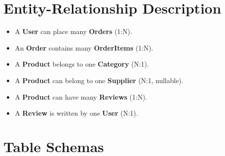 \documentclass[12pt,a4paper]{report}
\begin{document}
\section{Entity-Relationship Description}
\begin{itemize}[noitemsep]
  \item A \textbf{User} can place many \textbf{Orders} (1:N).
  \item An \textbf{Order} contains many \textbf{OrderItems} (1:N).
  \item A \textbf{Product} belongs to one \textbf{Category} (N:1).
  \item A \textbf{Product} can belong to one \textbf{Supplier} (N:1, nullable).
  \item A \textbf{Product} can have many \textbf{Reviews} (1:N).
  \item A \textbf{Review} is written by one \textbf{User} (N:1).
\end{itemize}

\section{Table Schemas}
\end{document}

